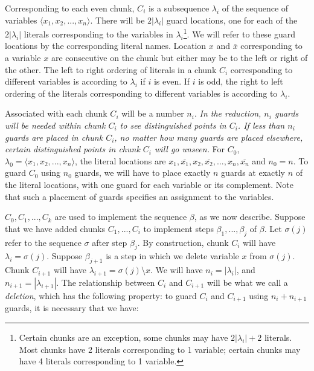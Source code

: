 \documentclass[11pt]{article}
\begin{document}
Corresponding to each even chunk, $C_i$ is a subsequence $\lambda_i$ of the sequence of variables $\langle x_1, x_2, ..., x_n \rangle$.  There will be $2|\lambda_i|$ guard locations, one for each of the $2|\lambda_i|$ literals corresponding to the variables in $\lambda_i$\footnote{Certain chunks are an exception, some chunks may have $2|\lambda_i| + 2$ literals.  Most chunks have 2 literals corresponding to 1 variable; certain chunks may have 4 literals corresponding to 1 variable.}.  We will refer to these guard locations by the corresponding literal names.  Location $x$ and $\overline{x}$ corresponding to a variable $x$ are consecutive on the chunk but either may be to the left or right of the other.  The left to right ordering of literals in a chunk $C_i$ corresponding to different variables is according to $\lambda_i$ if $i$ is even.  If $i$ is odd, the right to left ordering of the literals corresponding to different variables is according to $\lambda_i$.

Associated with each chunk $C_i$ will be a number $n_i$.  {\em In the reduction, $n_i$ guards will be needed
within chunk $C_i$ to see distinguished points in $C_i$. If less than $n_i$ guards are placed in chunk $C_i$, no matter how many guards are placed elsewhere, certain distinguished points in chunk $C_i$ will go unseen.}  For $C_0$, $\lambda_0 = \langle x_1, x_2, ..., x_n \rangle$, the literal locations are $x_1, \overline{x_1}, x_2, \overline{x_2}, ..., x_n, \overline{x_n}$ and $n_0 = n$.  To guard $C_0$ using $n_0$ guards, we will have to place exactly $n$ guards at exactly $n$ of the literal locations,
with one guard for each variable or its complement.  Note that such a placement of guards specifies an assignment to the variables.

$C_0, C_1, ..., C_k$ are used to implement the sequence $\beta$, as we now describe.  Suppose that we have added chunks $C_1, ..., C_i$ to implement steps $\beta_1, ..., \beta_j$ of $\beta$.  Let $\sigma(j)$ refer to the sequence $\sigma$ after step $\beta_j$.  By construction, chunk $C_i$ will have $\lambda_i = \sigma(j)$.  Suppose $\beta_{j+1}$ is a step in which we delete variable $x$ from $\sigma(j)$.  Chunk $C_{i+1}$ will have $\lambda_{i+1} = \sigma(j) \setminus x$.  We will have $n_i = | \lambda_i |$, and $n_{i+1} = | \lambda_{i+1} |$.  The relationship between $C_i$ and $C_{i+1}$ will be what we call a \textit{deletion}, which has the following property: to guard $C_i$ and $C_{i+1}$ using $n_i + n_{i+1}$ guards, it is necessary that we have:
\end{document}
